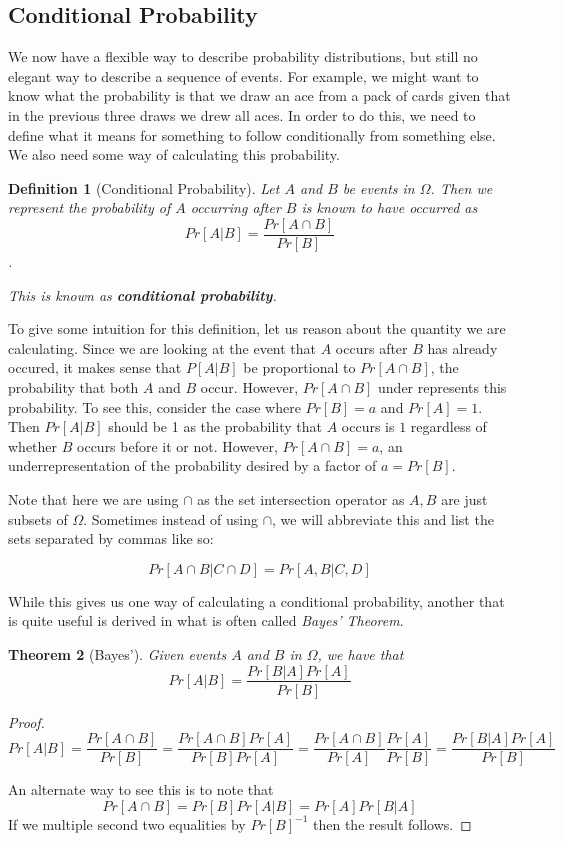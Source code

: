 \documentclass[12pt,a4paper]{article}
\newtheorem{theorem}{Theorem}
\newtheorem{definition}[theorem]{Definition}
\begin{document}
\subsection{Conditional Probability}

We now have a flexible way to describe probability distributions, but still no
elegant way to describe a sequence of events. For example, we might want to
know what the probability is that we draw an ace from a pack of cards given
that in the previous three draws we drew all aces. In order to do this, we
need to define what it means for something to follow conditionally from
something else. We also need some way of calculating this probability.

\begin{definition}[Conditional Probability]
Let $A$ and $B$ be events in $\Omega$. Then we represent the probability of $A$
occurring after $B$ is known to have occurred as 
\[Pr[A|B] = \frac{Pr[A \cap B]}{Pr[B]}\].

This is known as \textbf{conditional probability}.
\end{definition}

To give some intuition for this definition, let us reason about the quantity we
are calculating. Since we are looking at the event that $A$ occurs after $B$
has already occured, it makes sense that $P[A|B]$ be proportional to $Pr[A \cap
B]$, the probability that both $A$ and $B$ occur. However, $Pr[A \cap B]$ under
represents this probability. To see this, consider the case where $Pr[B] = a$ and $Pr[A] =
1$. Then $Pr[A|B]$ should be 1 as the probability that $A$ occurs is $1$
regardless of whether $B$ occurs before it or not. However, $Pr[A \cap B] = a$,
an underrepresentation of the probability desired by a factor of $a = Pr[B]$.

Note that here we are using $\cap$ as the set intersection operator as $A,B$ are just
subsets of $\Omega$. Sometimes instead of using $\cap$, we will abbreviate this
and list the sets separated by commas like so:

\[Pr[A\cap B|C \cap D] = Pr[A,B|C,D]\]

While this gives us one way of calculating a conditional probability, another
that is quite useful is derived in what is often called \textit{Bayes' Theorem}.

\begin{theorem}[Bayes']
Given events $A$ and $B$ in $\Omega$, we have that
\[Pr[A|B] = \frac{Pr[B|A] Pr[A]}{Pr[B]}\]
\end{theorem}
\begin{proof}
\[Pr[A|B] = \frac{Pr[A \cap B]}{Pr[B]} =\frac{Pr[A \cap B] Pr[A]}{Pr[B] Pr[A]}
= \frac{Pr[A \cap B]}{Pr[A]} \frac{Pr[A]}{Pr[B]} = \frac{Pr[B|A] Pr[A]}{Pr[B]}\]

An alternate way to see this is to note that
\[Pr[A \cap B] = Pr[B] Pr[A|B] = Pr[A] Pr[B|A]\] 
If we multiple second two equalities by $Pr[B]^{-1}$ then the result follows.
\end{proof}
\end{document}
